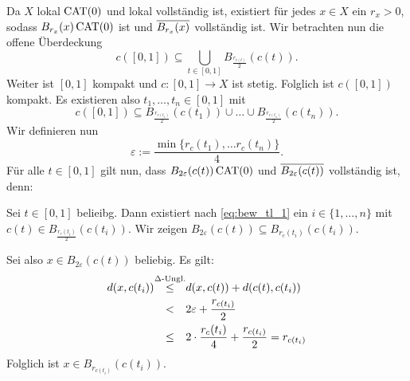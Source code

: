 \begin{beweis}
\label{bew:tech_lemma}
	Da $X$ lokal $\operatorname{CAT(0)}$ und lokal vollständig ist, existiert für jedes $x \in X$ ein $r_x > 0$, sodass $B_{r_x}(x) \operatorname{CAT(0)}$ ist und $\overline{B_{r_x}(x)}$ vollständig ist.
	Wir betrachten nun die offene Überdeckung
	\[
		c([0,1]) \subseteq \bigcup_{t \in [0,1]} B_{\frac{r_{c(t)}}{2}}(c(t)).
	\]
	Weiter ist $[0,1]$ kompakt und $c \colon [0,1] \rightarrow X$ ist stetig.
	Folglich ist $c([0,1])$ kompakt.
	Es existieren also $t_1, \dots, t_n \in [0,1]$ mit
	\begin{equation}
		c([0,1]) \subseteq B_{\frac{r_{c(t_1)}}{2}}(c(t_1)) \cup \dots \cup B_{\frac{r_{c(t_n)}}{2}}(c(t_n)). \label{eq:bew_tl_1}
	\end{equation}
	Wir definieren nun
	\[
		\varepsilon := \frac{\min\{r_c(t_1), \dots r_c(t_n)\}}{4}.
	\]
	Für alle $t \in [0,1]$ gilt nun, dass $B_{2\varepsilon}(c(t)) \operatorname{CAT(0)}$ und $\overline{B_{2\varepsilon}(c(t))}$ vollständig ist, denn:
	
	Sei $t \in [0,1]$ belieibg.
	Dann existiert nach \eqref{eq:bew_tl_1} ein $i \in \{1, \dots, n\}$ mit $c(t) \in B_{\frac{r_c(t_i)}{2}}(c(t_i))$.
	Wir zeigen $B_{2\varepsilon}(c(t)) \subseteq B_{r_c(t_i)}(c(t_i))$.
	
	Sei also $x \in B_{2\varepsilon}(c(t))$ beliebig.
	Es gilt:
	\begin{align*}
		d(x,c(t_i)) &\stack{\Delta\text{-Ungl.}}{\leq} d(x,c(t)) + d(c(t),c(t_i)) \\
		&\stack{}{<} 2\varepsilon + \frac{r_{c(t_i)}}{2} \\
		&\stack{}{\leq} 2 \cdot \frac{r_c(t_i)}{4} + \frac{r_{c(t_i)}}{2} = r_{c(t_i)}
	\end{align*}
	Folglich ist $x \in B_{r_{c(t_i)}} (c(t_i))$.
	

\end{beweis}
